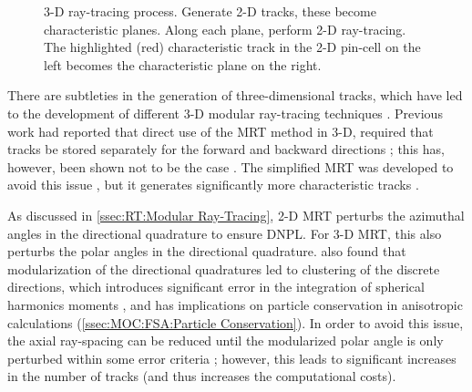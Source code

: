 {{{{          \begin{figure}[h]
            \centering
            \def\svgwidth{0.85\linewidth}
            
            \caption{3-D ray-tracing process. Generate 2-D tracks, these become characteristic planes. Along each plane, perform 2-D ray-tracing. The highlighted (red) characteristic track in the 2-D pin-cell on the left becomes the characteristic plane on the right.}
            \label{fig:RT:3-D Ray-tracing}
          \end{figure}

          There are subtleties in the generation of three-dimensional tracks, which have led to the development of different 3-D modular ray-tracing techniques \cite{Kochunas2013,Shaner2015,3DMOCCasl}.
          Previous work had reported that direct use of the \ac{MRT} method in 3-D, required that tracks be stored separately for the forward and backward directions \cite{Kochunas2013};
          this has, however, been shown not to be the case \cite{Shaner2015}.
          The simplified \ac{MRT} was developed to avoid this issue \cite{Kochunas2013}, but it generates significantly more characteristic tracks \cite{Shaner2015}.

          As discussed in \cref{ssec:RT:Modular Ray-Tracing}, 2-D \ac{MRT} perturbs the azimuthal angles in the directional quadrature to ensure \ac{DNPL}.
          For 3-D \ac{MRT}, this also perturbs the polar angles in the directional quadrature.
          \citet{Kochunas2013,3DMOCCasl} also found that modularization of the directional quadratures led to clustering of the discrete directions, which introduces significant error in the integration of spherical harmonics moments \cite{Kochunas2013}, and has implications on particle conservation in anisotropic calculations (\cref{ssec:MOC:FSA:Particle Conservation}).
          In order to avoid this issue, the axial ray-spacing can be reduced until the modularized polar angle is only perturbed within some error criteria \cite{Kochunas2013}; however, this leads to significant increases in the number of tracks (and thus increases the computational costs).
        }

}}}
